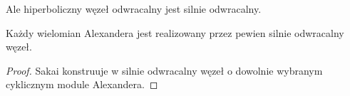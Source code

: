 Ale hiperboliczny węzeł odwracalny jest silnie odwracalny.

\begin{proposition}
    Każdy wielomian Alexandera jest realizowany przez pewien silnie odwracalny węzeł.
\end{proposition}

\begin{proof}
%
    Sakai konstruuje w \cite{sakai83} silnie odwracalny węzeł o dowolnie wybranym cyklicznym module Alexandera.
\end{proof}


